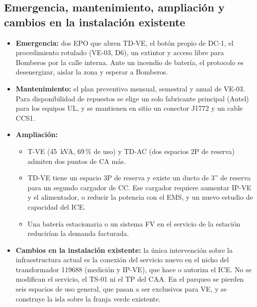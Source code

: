 \subsection{Emergencia, mantenimiento, ampliación y cambios en la instalación existente}
\label{sec:ampliacion}
\begin{itemize}
\item \textbf{Emergencia:} dos EPO que abren TD-VE, el botón propio de DC-1, el procedimiento rotulado (VE-03, D6), un extintor y acceso libre para Bomberos por la calle interna. Ante un incendio de batería, el protocolo es desenergizar, aislar la zona y esperar a Bomberos.
\item \textbf{Mantenimiento:} el plan preventivo mensual, semestral y anual de VE-03. Para disponibilidad de repuestos se elige un solo fabricante principal (Autel) para los equipos UL, y se mantienen en sitio un conector J1772 y un cable CCS1.
\item \textbf{Ampliación:}
  \begin{itemize}
  \item T-VE (45~kVA, 69\,\% de uso) y TD-AC (dos espacios 2P de reserva) admiten dos puntos de CA más.
  \item TD-VE tiene un espacio 3P de reserva y existe un ducto de 3'' de reserva para un segundo cargador de CC. Ese cargador requiere aumentar IP-VE y el alimentador, o reducir la potencia con el EMS, y un nuevo estudio de capacidad del ICE.
  \item Una batería estacionaria o un sistema FV en el servicio de la estación reducirían la demanda facturada.
  \end{itemize}
\item \textbf{Cambios en la instalación existente:} la única intervención sobre la infraestructura actual es la conexión del servicio nuevo en el nicho del transformador 119688 (medición y IP-VE), que hace o autoriza el ICE. No se modifican el servicio, el TS-01 ni el TP del CAA. En el parqueo se pierden seis espacios de uso general, que pasan a ser exclusivos para VE, y se construye la isla sobre la franja verde existente.
\end{itemize}
